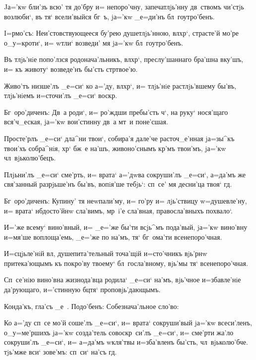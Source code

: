 Jа='кw бли'зъ всю' тя до'бру и= непоро'чну, 
запечатлjь'нну дв~ствомъ чи'стjь возлюби`, въ тя` 
всели'выйся бг~ъ, jа='кw _е=ди'нъ бл~гоутро'бенъ.


I=рмо'съ: Неи'стовствующееся бу'рею душетлjь'нною, 
вл хр`, страсте'й мо'ре о_у=кроти`, и= w\т тли` 
возведи' мя jа='кw бл~гоутро'бенъ.

Въ тлjь'нiе попо'лзся родонача'льникъ, вл хр`, 
преслу'шаннаго бра'шна вку'шъ, и= къ животу` возведе'нъ 
бы'сть стр твое'ю.

Живо'тъ низше'лъ _е=си` ко а='ду, вл хр`, и= 
тлjь'нiе растлjь'вшему бы'въ, тлjь'нiемъ и=сточи'лъ 
_е=си` воскр.

Бг~оро'диченъ: Дв~а роди`, и= ро'ждши пребы'сть 
ч`, на руку` нося'щаго вся'ч_еская, jа='кw вои'стинну 
дв~а мт~и поне'сшая. 


Просте'рлъ _е=си` дла^ни твои`, собира'я дале'че 
расточ_е'нная jа=зы^къ твои'хъ собра^нiя, хр` бж~е 
на'шъ, живоно'снымъ кр'мъ твои'мъ, jа='кw 
чл~вjьколю'бецъ.

Плjьни'лъ _е=си` сме'рть, и= врата` а='дwва сокруши'лъ 
_е=си`, а=да'мъ же свя'занный разрjьше'нъ бы'въ, вопiя'ше 
тебjь`: сп~се' мя десни'ца твоя` гд.

Бг~оро'диченъ: Купину' тя неwпали'му, и= го'ру и= 
лjь'ствицу w=душевле'ну, и= врата` нб досто'йнw 
сла'вимъ, мр~i'е сла'вная, правосла'вныхъ похвало`. 


И='же всему` вино'вный, и= _е='же бы'ти всjь^мъ 
пода'вый, jа='кw вино'вну и=мя'ше воплоща'емь, _е='же по 
на'мъ, тя` бг~ома'ти всенепоро'чная.

И=сцjьле'нiй вл, душепита'тельный точа'щiй 
и=сто'чникъ вjь'рнw притека'ющымъ къ покро'ву твоему` 
бл~госла'вному, вjь'мы тя` всенепоро'чная. 

Сп~се'нiю вино'вна жизнода'вца родила` _е=си` на'мъ, 
вjь'чное и=збавле'нiе да'рующаго, и='стинную бц тя` 
проповjь'дающымъ.

Конда'къ, гла'съ _е~. Подо'бенъ: Собезнача'льное 
сло'во:

Ко а='ду сп~се мо'й соше'лъ _е=си`, и= врата` 
сокруши'вый jа='кw всеси'ленъ, о_у=ме'ршихъ jа='кw 
созда'тель совоскр~си'лъ _е=си`, и= сме'рти жа'ло 
сокруши'лъ _е=си`, и= а=да'мъ w\т кля'твы и=зба'вленъ 
бы'сть, чл~вjьколю'бче. тjь'мже вси` зове'мъ: сп~си` 
на'съ гд.

